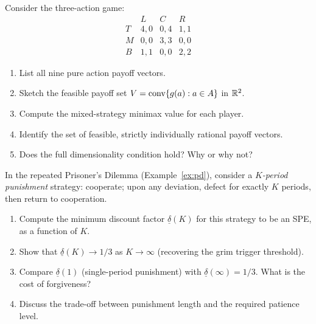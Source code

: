 \documentclass[11pt,a4paper]{article}
\begin{document}
\begin{exercise}
\label{ex:feasible-set}
Consider the three-action game:
\[
\begin{array}{c|ccc}
  & L & C & R \\ \hline
T & 4,0 & 0,4 & 1,1 \\
M & 0,0 & 3,3 & 0,0 \\
B & 1,1 & 0,0 & 2,2
\end{array}
\]
\begin{enumerate}[label=(\alph*)]
    \item List all nine pure action payoff vectors.
    \item Sketch the feasible payoff set
    $V = \operatorname{conv}\{g(a) : a \in A\}$ in $\mathbb{R}^2$.
    \item Compute the mixed-strategy minimax value for each player.
    \item Identify the set of feasible, strictly individually rational
    payoff vectors.
    \item Does the full dimensionality condition hold? Why or why not?
\end{enumerate}
\end{exercise}

\begin{exercise}
\label{ex:limited-punishment}
In the repeated Prisoner's Dilemma (Example~\ref{ex:pd}), consider a
\emph{$K$-period punishment} strategy: cooperate; upon any deviation,
defect for exactly $K$ periods, then return to cooperation.
\begin{enumerate}[label=(\alph*)]
    \item Compute the minimum discount factor $\underline{\delta}(K)$ for
    this strategy to be an SPE, as a function of $K$.
    \item Show that $\underline{\delta}(K) \to 1/3$ as $K \to \infty$
    (recovering the grim trigger threshold).
    \item Compare $\underline{\delta}(1)$ (single-period punishment) with
    $\underline{\delta}(\infty) = 1/3$. What is the cost of forgiveness?
    \item Discuss the trade-off between punishment length and the required
    patience level.
\end{enumerate}
\end{exercise}
\end{document}
